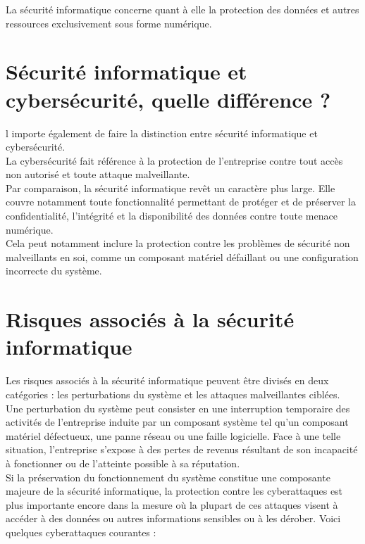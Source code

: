  La sécurité informatique concerne quant à elle la protection des données et autres ressources exclusivement sous forme numérique.\\
 \section{Sécurité informatique et cybersécurité, quelle différence ?}
 l importe également de faire la distinction entre sécurité informatique et cybersécurité.\\
 
 La cybersécurité fait référence à la protection de l’entreprise contre tout accès non autorisé et toute attaque malveillante.\\
 
 Par comparaison, la sécurité informatique revêt un caractère plus large. Elle couvre notamment toute fonctionnalité permettant de protéger et de préserver la confidentialité, l’intégrité et la disponibilité des données contre toute menace numérique.\\ Cela peut notamment inclure la protection contre les problèmes de sécurité non malveillants en soi, comme un composant matériel défaillant ou une configuration incorrecte du système.\\
 \section{Risques associés à la sécurité informatique}
 Les risques associés à la sécurité informatique peuvent être divisés en deux catégories : les perturbations du système et les attaques malveillantes ciblées.\\
 
 Une perturbation du système peut consister en une interruption temporaire des activités de l’entreprise induite par un composant système tel qu’un composant matériel défectueux, une panne réseau ou une faille logicielle. Face à une telle situation, l’entreprise s’expose à des pertes de revenus résultant de son incapacité à fonctionner ou de l’atteinte possible à sa réputation.\\
 
 Si la préservation du fonctionnement du système constitue une composante majeure de la sécurité informatique, la protection contre les cyberattaques est plus importante encore dans la mesure où la plupart de ces attaques visent à accéder à des données ou autres informations sensibles ou à les dérober. Voici quelques cyberattaques courantes :
 
